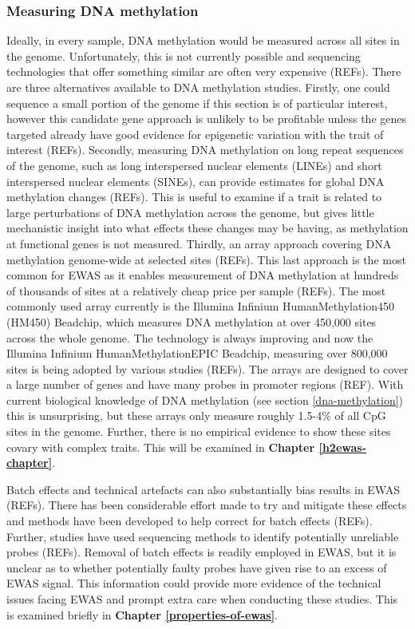 \documentclass[11pt,twoside]{bristolthesis}
\begin{document}
\hypertarget{measuring-dna-methylation}{%
\subsubsection{Measuring DNA methylation}\label{measuring-dna-methylation}}

Ideally, in every sample, DNA methylation would be measured across all sites in the genome. Unfortunately, this is not currently possible and sequencing technologies that offer something similar are often very expensive (REFs). There are three alternatives available to DNA methylation studies. Firstly, one could sequence a small portion of the genome if this section is of particular interest, however this candidate gene approach is unlikely to be profitable unless the genes targeted already have good evidence for epigenetic variation with the trait of interest (REFs). Secondly, measuring DNA methylation on long repeat sequences of the genome, such as long interspersed nuclear elements (LINEs) and short interspersed nuclear elements (SINEs), can provide estimates for global DNA methylation changes (REFs). This is useful to examine if a trait is related to large perturbations of DNA methylation across the genome, but gives little mechanistic insight into what effects these changes may be having, as methylation at functional genes is not measured. Thirdly, an array approach covering DNA methylation genome-wide at selected sites (REFs). This last approach is the most common for EWAS as it enables measurement of DNA methylation at hundreds of thousands of sites at a relatively cheap price per sample (REFs). The most commonly used array currently is the Illumina Infinium HumanMethylation450 (HM450) Beadchip, which measures DNA methylation at over 450,000 sites across the whole genome. The technology is always improving and now the Illumina Infinium HumanMethylationEPIC Beadchip, measuring over 800,000 sites is being adopted by various studies (REFs). The arrays are designed to cover a large number of genes and have many probes in promoter regions (REF). With current biological knowledge of DNA methylation (see section \ref{dna-methylation}) this is unsurprising, but these arrays only measure roughly 1.5-4\% of all CpG sites in the genome. Further, there is no empirical evidence to show these sites covary with complex traits. This will be examined in \textbf{Chapter \ref{h2ewas-chapter}}.

Batch effects and technical artefacts can also substantially bias results in EWAS (REFs). There has been considerable effort made to try and mitigate these effects and methods have been developed to help correct for batch effects (REFs). Further, studies have used sequencing methods to identify potentially unreliable probes (REFs). Removal of batch effects is readily employed in EWAS, but it is unclear as to whether potentially faulty probes have given rise to an excess of EWAS signal. This information could provide more evidence of the technical issues facing EWAS and prompt extra care when conducting these studies. This is examined briefly in \textbf{Chapter \ref{properties-of-ewas}}.
\end{document}

